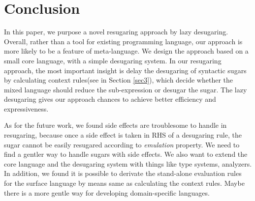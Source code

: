 \section{Conclusion}
\label{sec7}


In this paper, we purpose a novel resugaring approach by lazy desugaring.
Overall, rather than a tool for existing programming language, our approach is more likely to be a feature of meta-language. We design the approach based on a small core language, with a simple desugaring system.
In our resugaring approach, the most important insight is delay the desugaring of syntactic sugars by calculating context rules(see in Section \ref{sec3}), which decide whether the mixed language should reduce the sub-expression or desugar the sugar. The lazy desugaring gives our approach chances to achieve better efficiency and expressiveness.



As for the future work, we found side effects are troublesome to handle in resugaring, because once a side effect is taken in RHS of a desugaring rule, the sugar cannot be easily resugared according to \emph{emulation} property. We need to find a gentler way to handle sugars with side effects. We also want to extend the core language and the desugaring system with things like type systems, analyzers. In addition, we found it is possible to derivate the stand-alone evaluation rules for the surface language by means same as calculating the context rules. Maybe there is a more gentle way for developing domain-specific languages.
